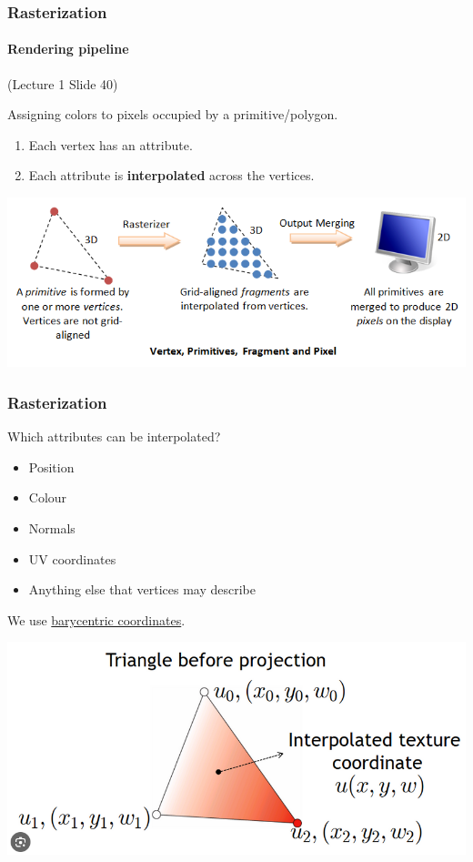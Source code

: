 \documentclass{beamer}
\begin{document}
\begin{frame}
    \frametitle{Rasterization}
    \framesubtitle{Rendering pipeline}

    (Lecture 1 Slide 40)

    Assigning colors to pixels occupied by a primitive/polygon.

    \begin{enumerate}
        \item Each vertex has an attribute.
        \item Each attribute is \textbf{interpolated} across the vertices.
    \end{enumerate}

    \vspace{1em}

    {\begin{center} \includegraphics[scale=0.5]{q5-Graphics3D_VertexFragment.png} \end{center}}

\end{frame}

\begin{frame}
    \frametitle{Rasterization}

    Which attributes can be interpolated?
    \begin{itemize}
        \item Position
        \item Colour
        \item Normals
        \item UV coordinates
        \item Anything else that vertices may describe
    \end{itemize}

    We use \href{https://www.scratchapixel.com/lessons/3d-basic-rendering/ray-tracing-rendering-a-triangle/barycentric-coordinates.html}{barycentric coordinates}.

    \begin{center}
        \includegraphics[scale=0.4]{q6-bary.png}
    \end{center}

\end{frame}
\end{document}
